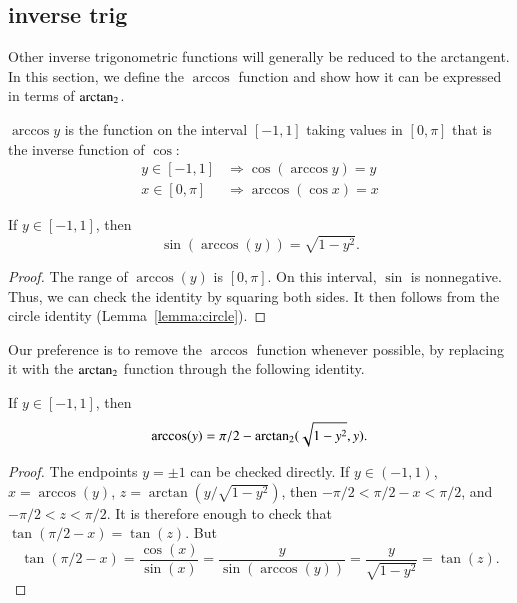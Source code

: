 \subsection{inverse trig}

Other inverse trigonometric functions will generally be reduced to
the arctangent.  In this section, we define the $\arccos$ function and show how it can be expressed in terms of ${\operatorname{arctan_2}}$.

\begin{definition}[arccos]\label{def:arccos}
$\arccos y$ is the function on the interval $[-1,1]$
taking values in $[0,\pi]$ that is the inverse function of $\cos$:
    $$\begin{array}{lll}
        y\in [-1,1] &\Rightarrow \cos(\arccos y) = y\\
        x\in[0,\pi] &\Rightarrow \arccos(\cos x) = x
    \end{array}$$
\end{definition}

\begin{lemma}\label{lemma:sin-arccos} 
If $y\in[-1,1]$, then
    $$\sin(\arccos(y)) = \sqrt{1-y^2}.$$
\end{lemma}

\begin{proof}
    The range of $\arccos(y)$ is $[0,\pi]$.  On this interval, $\sin$
    is nonnegative.  Thus, we can check the identity by squaring
    both sides.  It then follows from the circle identity
    (Lemma~\ref{lemma:circle}).
\end{proof}


Our preference is to remove the $\arccos$ function whenever
possible, by replacing it with the ${\operatorname{arctan_2}}$ function through the
following identity.  

\begin{lemma}\label{lemma:arccos-arctan}  
If $y\in [-1,1]$, then
    $$\arccos(y) = \pi/2 - {\operatorname{arctan_2}}({ \sqrt{1-y^2}},{y}).$$
\end{lemma}

\begin{proof} The endpoints $y=\pm1$ can be checked directly.
If $y\in (-1,1)$,  $x = \arccos(y)$, 
$z = \arctan(y/\sqrt{1-y^2})$, then
    $-\pi/2 < \pi/2 - x < \pi/2$, and $-\pi/2 < z < \pi/2$.  It is
    therefore enough to check that
        $\tan(\pi/2 - x) = \tan(z)$.
    But
        $$\tan(\pi/2-x) = \frac{\cos(x)}{\sin(x)} = \frac{y}{
        \sin(\arccos(y))} = \frac{y}{ \sqrt{1-y^2}} = \tan(z).$$
\end{proof}

